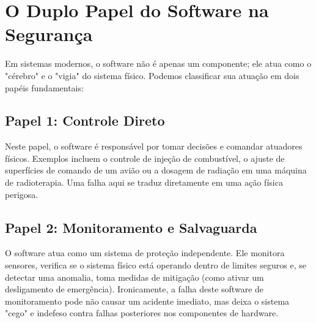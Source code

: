 \documentclass[12pt,a4paper,twoside]{report}
\begin{document}
\section{O Duplo Papel do Software na Segurança}

Em sistemas modernos, o software não é apenas um componente; ele atua como o "cérebro" e o "vigia" do sistema físico. Podemos classificar sua atuação em dois papéis fundamentais:

\subsection{Papel 1: Controle Direto}
Neste papel, o software é responsável por tomar decisões e comandar atuadores físicos. Exemplos incluem o controle de injeção de combustível, o ajuste de superfícies de comando de um avião ou a dosagem de radiação em uma máquina de radioterapia. Uma falha aqui se traduz diretamente em uma ação física perigosa.

\subsection{Papel 2: Monitoramento e Salvaguarda}
O software atua como um sistema de proteção independente. Ele monitora sensores, verifica se o sistema físico está operando dentro de limites seguros e, se detectar uma anomalia, toma medidas de mitigação (como ativar um desligamento de emergência). Ironicamente, a falha deste software de monitoramento pode não causar um acidente imediato, mas deixa o sistema "cego" e indefeso contra falhas posteriores nos componentes de hardware.
\end{document}
